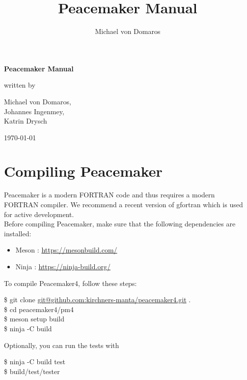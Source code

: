 \documentclass{scrartcl}
\begin{document}


\title{Peacemaker Manual}
\author{Michael von Domaros}
\begin{titlepage}
    \centering
    \Large

    \vspace*{5ex}
    \textbf{\Huge Peacemaker Manual}

    \vspace{\fill}
    written by
    
    \vspace{1ex}
    Michael von Domaros,\\
    Johannes Ingenmey,\\
    Katrin Drysch
    
    \vspace{2ex}
    \today
    \vspace{\fill}
\end{titlepage}

\tableofcontents
\pagebreak


\section{Compiling Peacemaker}

Peacemaker is a modern FORTRAN code and thus requires a modern FORTRAN compiler.
We recommend a recent version of gfortran which is used for active development. \\
Before compiling Peacemaker, make sure that the following dependencies are installed:
\begin{itemize}
    \item Meson : \url{https://mesonbuild.com/}
    \item Ninja : \url{https://ninja-build.org/}
\end{itemize}
To compile Peacemaker4, follow these steps:
\begin{addmargin}[1cm]{0cm}
    \ttfamily
    \$ git clone
    \url{git@github.com:kirchners-manta/peacemaker4.git} .\\
    \$ cd peacemaker4/pm4 \\
    \$ meson setup build \\
    \$ ninja -C build 
\end{addmargin}
Optionally, you can run the tests with
\begin{addmargin}[1cm]{0cm}
    \ttfamily
    \$ ninja -C build test \\
    \$ build/test/tester
\end{addmargin}
\end{document}
